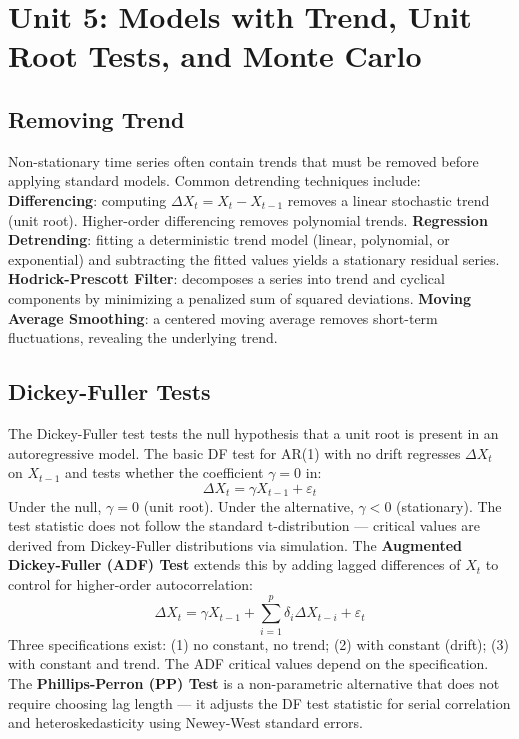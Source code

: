 \documentclass[11pt,a4paper]{article}
\begin{document}
\section{Unit 5: Models with Trend, Unit Root Tests, and Monte Carlo}

\subsection{Removing Trend}

Non-stationary time series often contain trends that must be removed before applying standard models. Common detrending techniques include: \textbf{Differencing}: computing $\Delta X_t = X_t - X_{t-1}$ removes a linear stochastic trend (unit root). Higher-order differencing removes polynomial trends. \textbf{Regression Detrending}: fitting a deterministic trend model (linear, polynomial, or exponential) and subtracting the fitted values yields a stationary residual series. \textbf{Hodrick-Prescott Filter}: decomposes a series into trend and cyclical components by minimizing a penalized sum of squared deviations. \textbf{Moving Average Smoothing}: a centered moving average removes short-term fluctuations, revealing the underlying trend.

\subsection{Dickey-Fuller Tests}

The Dickey-Fuller test tests the null hypothesis that a unit root is present in an autoregressive model. The basic DF test for AR(1) with no drift regresses $\Delta X_t$ on $X_{t-1}$ and tests whether the coefficient $\gamma = 0$ in:
\[
\Delta X_t = \gamma X_{t-1} + \varepsilon_t
\]
Under the null, $\gamma = 0$ (unit root). Under the alternative, $\gamma < 0$ (stationary). The test statistic does not follow the standard t-distribution --- critical values are derived from Dickey-Fuller distributions via simulation. The \textbf{Augmented Dickey-Fuller (ADF) Test} extends this by adding lagged differences of $X_t$ to control for higher-order autocorrelation:
\[
\Delta X_t = \gamma X_{t-1} + \sum_{i=1}^p \delta_i \Delta X_{t-i} + \varepsilon_t
\]
Three specifications exist: (1) no constant, no trend; (2) with constant (drift); (3) with constant and trend. The ADF critical values depend on the specification. The \textbf{Phillips-Perron (PP) Test} is a non-parametric alternative that does not require choosing lag length --- it adjusts the DF test statistic for serial correlation and heteroskedasticity using Newey-West standard errors.
\end{document}
